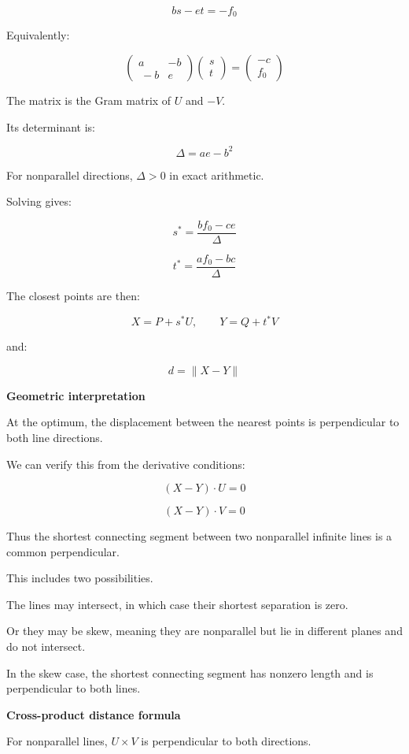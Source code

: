 \[
bs-et=-f_0
\]

Equivalently:

\[
\boxed{ \begin{pmatrix} a&-b\\\ -b&e \end{pmatrix} \begin{pmatrix}s\\t\end{pmatrix} = \begin{pmatrix}-c\\f_0\end{pmatrix} }
\]

The matrix is the Gram matrix of \(U\) and \(-V\).

Its determinant is:

\[
\boxed{\Delta=ae-b^2}
\]

For nonparallel directions, \(\Delta>0\) in exact arithmetic.

Solving gives:

\[
\boxed{ s^*=\frac{bf_0-ce}{\Delta} }
\]

\[
\boxed{ t^*=\frac{af_0-bc}{\Delta} }
\]

The closest points are then:

\[
\boxed{ X=P+s^*U,\qquad Y=Q+t^*V }
\]

and:

\[
\boxed{d=\|X-Y\|}
\]

\textbf{Geometric interpretation}

At the optimum, the displacement between the nearest points is perpendicular to both line directions.

We can verify this from the derivative conditions:

\[
(X-Y)\cdot U=0
\]

\[
(X-Y)\cdot V=0
\]

Thus the shortest connecting segment between two nonparallel infinite lines is a common perpendicular.

This includes two possibilities.

The lines may intersect, in which case their shortest separation is zero.

Or they may be skew, meaning they are nonparallel but lie in different planes and do not intersect.

In the skew case, the shortest connecting segment has nonzero length and is perpendicular to both lines.

\textbf{Cross-product distance formula}

For nonparallel lines, \(U\times V\) is perpendicular to both directions.

